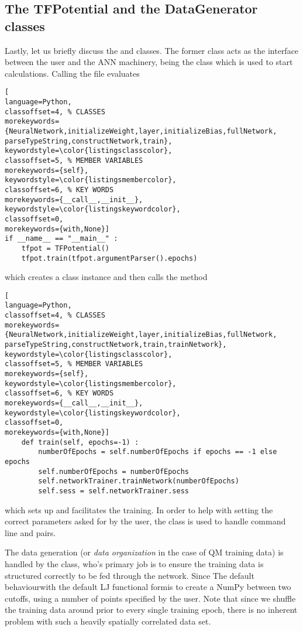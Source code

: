 \documentclass[../../master.tex]{subfiles}
\begin{document}
\subsection{The TFPotential and the DataGenerator classes}
Lastly, let us briefly discuss the  and  classes. The former class acts as the interface between the user and the ANN machinery, being the class which is used to start calculations. Calling the  file evaluates  
\begin{lstlisting}[
language=Python,
classoffset=4, % CLASSES
morekeywords={NeuralNetwork,initializeWeight,layer,initializeBias,fullNetwork, parseTypeString,constructNetwork,train},
keywordstyle=\color{listingsclasscolor},
classoffset=5, % MEMBER VARIABLES
morekeywords={self},
keywordstyle=\color{listingsmembercolor},
classoffset=6, % KEY WORDS
morekeywords={__call__,__init__},
keywordstyle=\color{listingskeywordcolor},
classoffset=0,
morekeywords={with,None}]
if __name__ == "__main__" :
    tfpot = TFPotential()
    tfpot.train(tfpot.argumentParser().epochs)
\end{lstlisting}
which creates a  class instance and then calls the  method
\begin{lstlisting}[
language=Python,
classoffset=4, % CLASSES
morekeywords={NeuralNetwork,initializeWeight,layer,initializeBias,fullNetwork, parseTypeString,constructNetwork,train,trainNetwork},
keywordstyle=\color{listingsclasscolor},
classoffset=5, % MEMBER VARIABLES
morekeywords={self},
keywordstyle=\color{listingsmembercolor},
classoffset=6, % KEY WORDS
morekeywords={__call__,__init__},
keywordstyle=\color{listingskeywordcolor},
classoffset=0,
morekeywords={with,None}]
    def train(self, epochs=-1) :
        numberOfEpochs = self.numberOfEpochs if epochs == -1 else epochs
        self.numberOfEpochs = numberOfEpochs
        self.networkTrainer.trainNetwork(numberOfEpochs)
        self.sess = self.networkTrainer.sess
\end{lstlisting}
which sets up and facilitates the training. In order to help with setting the correct parameters asked for by the user, the  class is used to handle command line  and  pairs. 

The data generation (or \emph{data organization} in the case of QM training data) is handled by the  class, who's primary job is to ensure the training data is structured correctly to be fed through the network. Since The default behaviour\textemdash with the default LJ functional form\textemdash is to create a NumPy  between two cutoffs, using a number of points specified by the user. Note that since we shuffle the training data around prior to every single training epoch, there is no inherent problem with such a heavily spatially correlated data set. 
\end{document}
